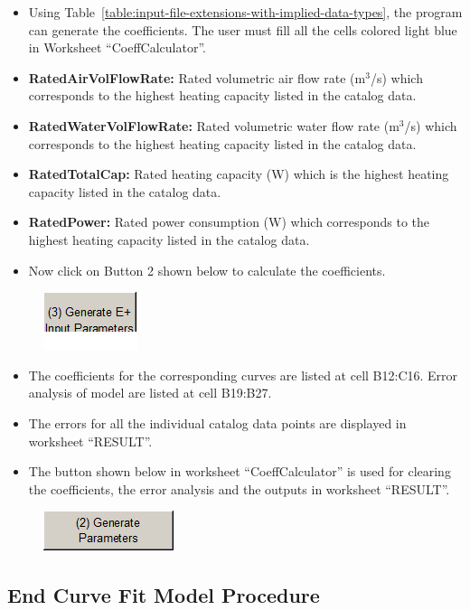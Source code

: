 \begin{itemize}
\item
  Using Table~\ref{table:input-file-extensions-with-implied-data-types}, the program can generate the coefficients. The user must fill all the cells colored light blue in Worksheet ``CoeffCalculator''.
\item
  \textbf{RatedAirVolFlowRate:} Rated volumetric air flow rate (m\(^{3}\)/s) which corresponds to the highest heating capacity listed in the catalog data.
\item
  \textbf{RatedWaterVolFlowRate:} Rated volumetric water flow rate (m\(^{3}\)/s) which corresponds to the highest heating capacity listed in the catalog data.
\item
  \textbf{RatedTotalCap:} Rated heating capacity (W) which is the highest heating capacity listed in the catalog data.
\item
  \textbf{RatedPower:} Rated power consumption (W) which corresponds to the highest heating capacity listed in the catalog data.
\item
  Now click on Button 2 shown below to calculate the coefficients.
\end{itemize}

\begin{figure}[htbp]
\centering
\includegraphics{media/image060.png}
\caption{}
\end{figure}

\begin{itemize}
\item
  The coefficients for the corresponding curves are listed at cell B12:C16. Error analysis of model are listed at cell B19:B27.
\item
  The errors for all the individual catalog data points are displayed in worksheet ``RESULT''.
\item
  The button shown below in worksheet ``CoeffCalculator'' is used for clearing the coefficients, the error analysis and the outputs in worksheet ``RESULT''.
\end{itemize}

\begin{figure}[htbp]
\centering
\includegraphics{media/image059.png}
\caption{}
\end{figure}

\subsection{End Curve Fit Model Procedure}\label{end-curve-fit-model-procedure}
